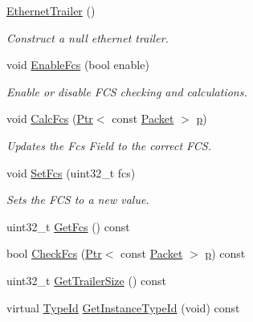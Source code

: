 \begin{DoxyCompactItemize}
\item 
\hyperlink{classns3_1_1EthernetTrailer_a8af92ee775fd0b5acfdbf0febb6275f1}{Ethernet\+Trailer} ()
\begin{DoxyCompactList}\small\item\em Construct a null ethernet trailer. \end{DoxyCompactList}\item 
void \hyperlink{classns3_1_1EthernetTrailer_a73f9ebb2a87880f08c83d7f2fcb519f8}{Enable\+Fcs} (bool enable)
\begin{DoxyCompactList}\small\item\em Enable or disable F\+CS checking and calculations. \end{DoxyCompactList}\item 
void \hyperlink{classns3_1_1EthernetTrailer_ac99d1210d2e2508af03f567358fdf5ba}{Calc\+Fcs} (\hyperlink{classns3_1_1Ptr}{Ptr}$<$ const \hyperlink{classns3_1_1Packet}{Packet} $>$ \hyperlink{lte__link__budget__x2__handover__measures_8m_ac9de518908a968428863f829398a4e62}{p})
\begin{DoxyCompactList}\small\item\em Updates the Fcs Field to the correct F\+CS. \end{DoxyCompactList}\item 
void \hyperlink{classns3_1_1EthernetTrailer_af43dde1fcd0834013aaea7aba210fd1a}{Set\+Fcs} (uint32\+\_\+t fcs)
\begin{DoxyCompactList}\small\item\em Sets the F\+CS to a new value. \end{DoxyCompactList}\item 
uint32\+\_\+t \hyperlink{classns3_1_1EthernetTrailer_ac50c4ecab3c159d82bf5e1e92ad6179c}{Get\+Fcs} () const 
\item 
bool \hyperlink{classns3_1_1EthernetTrailer_ab9152ae30e537d8ea6fd0aa9b191dfa2}{Check\+Fcs} (\hyperlink{classns3_1_1Ptr}{Ptr}$<$ const \hyperlink{classns3_1_1Packet}{Packet} $>$ \hyperlink{lte__link__budget__x2__handover__measures_8m_ac9de518908a968428863f829398a4e62}{p}) const 
\item 
uint32\+\_\+t \hyperlink{classns3_1_1EthernetTrailer_ad23415c752d9fe969e75f1474599ac3d}{Get\+Trailer\+Size} () const 
\item 
virtual \hyperlink{classns3_1_1TypeId}{Type\+Id} \hyperlink{classns3_1_1EthernetTrailer_a717e0566d175d6ed6f4be298946d3499}{Get\+Instance\+Type\+Id} (void) const 
\item 

\end{DoxyCompactItemize}
